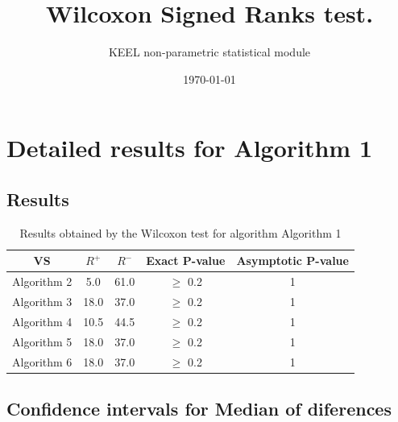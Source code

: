 \documentclass[a4paper,10pt]{article}
\title{Wilcoxon Signed Ranks test.}
\date{\today}
\author{KEEL non-parametric statistical module}
\begin{document}
\pagestyle{empty}
\maketitle
\thispagestyle{empty}



\section{Detailed results for Algorithm 1}


\subsection{Results}

\begin{table}[!htp]
\centering\small
\begin{tabular}{
|c|c|c|c|c|}
\hline
 VS & $R^{+}$ & $R^{-}$ & Exact P-value & Asymptotic P-value \\ \hline 
Algorithm 2 & 5.0 & 61.0 & $\geq$ 0.2 & 1\\ \hline 
Algorithm 3 & 18.0 & 37.0 & $\geq$ 0.2 & 1\\ \hline 
Algorithm 4 & 10.5 & 44.5 & $\geq$ 0.2 & 1\\ \hline 
Algorithm 5 & 18.0 & 37.0 & $\geq$ 0.2 & 1\\ \hline 
Algorithm 6 & 18.0 & 37.0 & $\geq$ 0.2 & 1\\ \hline 

\end{tabular}
\caption{Results obtained by the Wilcoxon test for algorithm Algorithm 1}
\end{table}

\subsection{Confidence intervals for Median of diferences}
\end{document}

